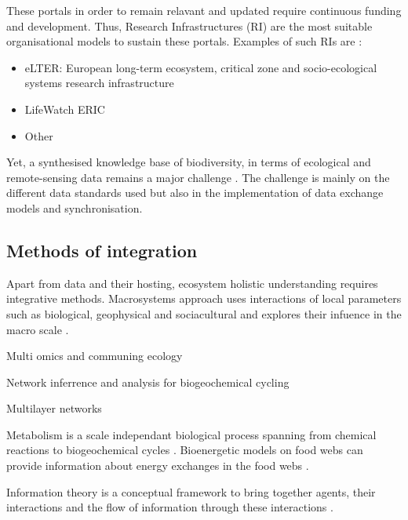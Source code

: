 These portals in order to remain relavant and updated require 
continuous funding and development. Thus, Research Infrastructures (RI) are 
the most suitable organisational models to sustain these portals. Examples 
of such RIs are :

\begin{itemize}

    \item eLTER: European long-term ecosystem, critical zone and socio-ecological systems research infrastructure 
    \item LifeWatch ERIC
    \item Other 

\end{itemize}

Yet, a synthesised knowledge base of biodiversity, in terms of ecological and
remote-sensing data remains a major challenge \parencite{feng2022Review}. The challenge
is mainly on the different data standards used but also in the implementation of 
data exchange models and synchronisation.

\subsection{Methods of integration}
\label{sec:meth-int}

Apart from data and their hosting, ecosystem holistic understanding requires
integrative methods. Macrosystems approach uses interactions of local parameters
such as biological, geophysical and sociacultural and explores their infuence in
the macro scale \parencite{heffernan2014}.

Multi omics and communing ecology \parencite{jurburg2022community}

Network inferrence and analysis for biogeochemical cycling \parencite{jameson2023Network}

Multilayer networks \parencite{marine-multilayers}

Metabolism is a scale independant biological process spanning from chemical reactions
to biogeochemical cycles \parencite{hall2018understanding}. Bioenergetic models on food 
webs can provide information about energy exchanges in the food webs \parencite{valdovinos2023bioenergetic}.

Information theory is a conceptual framework to bring together agents,
their interactions and the flow of information through these interactions \parencite{oconnor-information-ecology}.

